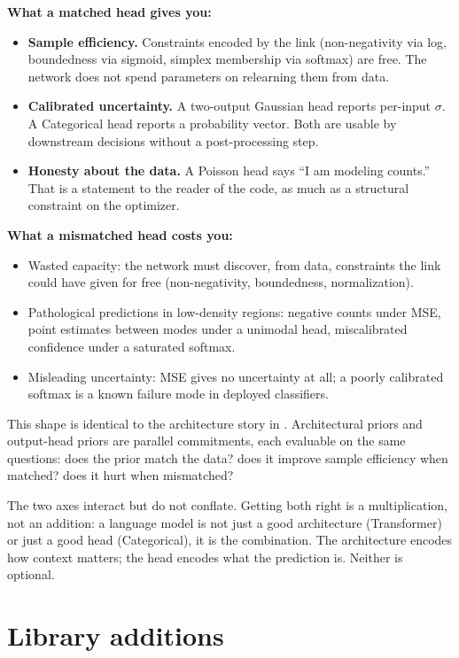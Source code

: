 \textbf{What a matched head gives you:}

\begin{itemize}
\item \textbf{Sample efficiency.} Constraints encoded by the link
  (non-negativity via log, boundedness via sigmoid, simplex membership
  via softmax) are free. The network does not spend parameters on
  relearning them from data.
\item \textbf{Calibrated uncertainty.} A two-output Gaussian head
  reports per-input $\sigma$. A Categorical head reports a probability
  vector. Both are usable by downstream decisions without a
  post-processing step.
\item \textbf{Honesty about the data.} A Poisson head says ``I am
  modeling counts.'' That is a statement to the reader of the code, as
  much as a structural constraint on the optimizer.
\end{itemize}

\textbf{What a mismatched head costs you:}

\begin{itemize}
\item Wasted capacity: the network must discover, from data, constraints
  the link could have given for free (non-negativity, boundedness,
  normalization).
\item Pathological predictions in low-density regions: negative counts
  under MSE, point estimates between modes under a unimodal head,
  miscalibrated confidence under a saturated softmax.
\item Misleading uncertainty: MSE gives no uncertainty at all; a
  poorly calibrated softmax is a known failure mode in deployed
  classifiers.
\end{itemize}

This shape is identical to the architecture story in
. Architectural priors and output-head priors
are parallel commitments, each evaluable on the same questions: does the
prior match the data? does it improve sample efficiency when matched?
does it hurt when mismatched?

The two axes interact but do not conflate. Getting both right is a
multiplication, not an addition: a language model is not just a good
architecture (Transformer) or just a good head (Categorical), it is the
combination. The architecture encodes how context matters; the head
encodes what the prediction is. Neither is optional.

\section{Library additions}\label{sec:library-additions}


